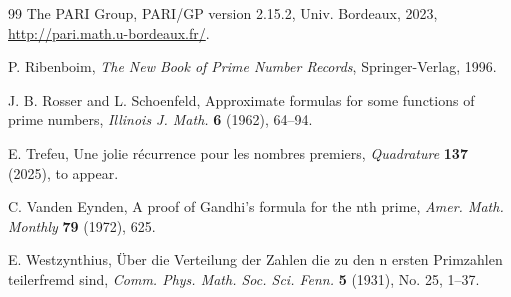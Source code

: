 \documentclass[12pt]{article}
\theoremstyle{plain}
\theoremstyle{definition}
\theoremstyle{remark}
\begin{document}
\begin{thebibliography}{99}
 The PARI Group, PARI/GP version 2.15.2, Univ. Bordeaux, 2023, \url{http://pari.math.u-bordeaux.fr/}.

 P. Ribenboim, \emph{The New Book of Prime Number Records}, Springer-Verlag, 1996.

 J. B. Rosser and L. Schoenfeld, Approximate formulas for some functions of prime numbers, \emph{Illinois J. Math.} \textbf{6} (1962), 64--94.

 E. Trefeu, Une jolie récurrence pour les nombres premiers, \emph{Quadrature} \textbf{137} (2025), to appear.

 C. Vanden Eynden, A proof of Gandhi's formula for the nth prime, \emph{Amer. Math. Monthly} \textbf{79} (1972), 625.

 E. Westzynthius, Über die Verteilung der Zahlen die zu den n ersten Primzahlen teilerfremd sind, \emph{Comm. Phys. Math. Soc. Sci. Fenn.} \textbf{5} (1931), No. 25, 1--37.

\end{thebibliography}
\end{document}
